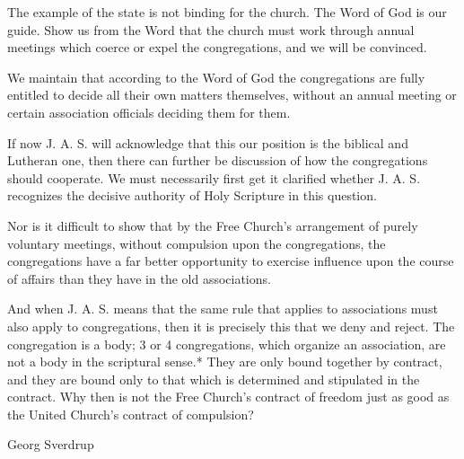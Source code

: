 The example of the state is not binding for the church. The Word of God is our guide. Show us from the Word that the church must work through annual meetings which coerce or expel the congregations, and we will be convinced.

We maintain that according to the Word of God the congregations are fully entitled to decide all their own matters themselves, without an annual meeting or certain association officials deciding them for them.

If now J. A. S. will acknowledge that this our position is the biblical and Lutheran one, then there can further be discussion of how the congregations should cooperate. We must necessarily first get it clarified whether J. A. S. recognizes the decisive authority of Holy Scripture in this question.

Nor is it difficult to show that by the Free Church’s arrangement of purely voluntary meetings, without compulsion upon the congregations, the congregations have a far better opportunity to exercise influence upon the course of affairs than they have in the old associations.

And when J. A. S. means that the same rule that applies to associations must also apply to congregations, then it is precisely this that we deny and reject. The congregation is a body; 3 or 4 congregations, which organize an association, are not a body in the scriptural sense.* They are only bound together by contract, and they are bound only to that which is determined and stipulated in the contract. Why then is not the Free Church’s contract of freedom just as good as the United Church’s contract of compulsion?

Georg Sverdrup